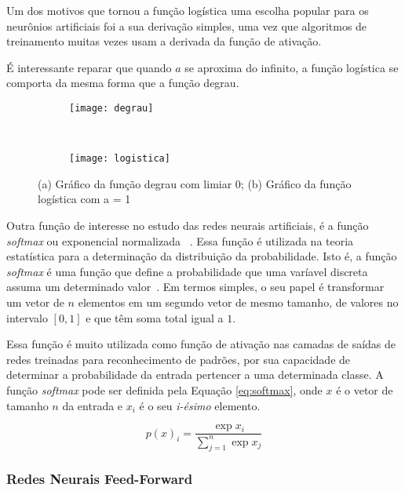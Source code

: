 Um dos motivos que tornou a função logística uma escolha popular para os neurônios artificiais foi a sua derivação simples, uma vez que algoritmos de treinamento muitas vezes usam a derivada da função de ativação.

É interessante reparar que quando $a$ se aproxima do infinito, a função logística se comporta da mesma forma que a função degrau.

\begin{figure}
 \centering
\begin{subfigure}{.9\textwidth}
  \centering
  \texttt{[image: degrau]}
	\caption{}
	\label{fig:ativacao:sub:degrau}
	\centering
\end{subfigure}\
\begin{subfigure}{.9\textwidth}
  \centering
  \texttt{[image: logistica]}
	\caption{}
	\label{fig:ativacao:sub:logistica}
	\centering
\end{subfigure}
\caption{(a) Gráfico da função degrau com limiar 0; (b) Gráfico da função logística com a = 1}
\label{fig:ativacao}
\centering
\end{figure}

Outra função de interesse no estudo das redes neurais artificiais, é a função \textit{softmax} ou exponencial normalizada ~\cite{bishop2006pattern}. Essa função é utilizada na teoria estatística para a determinação da distribuição da probabilidade. Isto é, a função \textit{softmax} é uma função que define a probabilidade que uma varíavel discreta assuma um determinado valor~\cite{altmanbs}. Em termos simples, o seu papel é transformar um vetor de $n$ elementos em um segundo vetor de mesmo tamanho, de valores no intervalo $[0,1]$ e que têm soma total igual a $1$.

Essa função é muito utilizada como função de ativação nas camadas de saídas de redes treinadas para reconhecimento de padrões, por sua capacidade de determinar a probabilidade da entrada pertencer a uma determinada classe. A função \textit{softmax} pode ser definida pela Equação \ref{eq:softmax}, onde $x$ é o vetor de tamanho $n$ da entrada e $x_i$ é o seu \textit{i-ésimo} elemento.

\begin{equation}
p(x)_i = \frac{\exp{x_i}}{\sum_{j=1}^n\exp{x_j}}
\label{eq:softmax}
\end{equation}




\subsubsection{Redes Neurais Feed-Forward}

